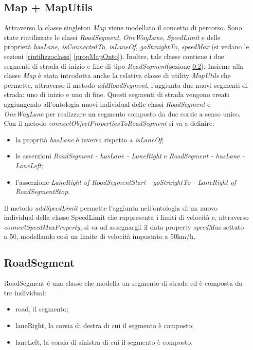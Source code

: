 \subsection{Map + MapUtils}
Attraverso la classe singleton \textit{Map} viene modellato il concetto di percorso.
Sono state riutilizzate le classi \textit{RoadSegment}, \textit{OneWayLane}, \textit{SpeedLimit} e delle propriet\`a \textit{hasLane}, \textit{isConnectedTo}, \textit{isLaneOf}, \textit{goStraightTo}, \textit{speedMax} (si vedano le sezioni \ref{riutilizzoclassi} \ref{propMapOnto}).
Inoltre, tale classe contiene i due segmenti di strada di inizio e fine di tipo \textit{RoadSegment}(sezione \ref{roadsegment}).
Insieme alla classe \textit{Map} \`e stata introdotta anche la relativa classe di utility \textit{MapUtils} che permette, attraverso il metodo \textit{addRoadSegment}, l'aggiunta due nuovi segmenti di strada: uno di inizio e uno di fine.
Questi segmenti di strada vengono creati aggiungendo all'ontologia nuovi individual delle classi \textit{RoadSegment} e \textit{OneWayLane} per realizzare un segmento composto da due corsie a senso unico.
Con il metodo \textit{connectObjectPropertiesToRoadSegment} si va a definire:
\begin{itemize}
\item la proprit\`a \textit{hasLane} \`e inversa rispetto a \textit{isLaneOf};
\item le asserzioni \textit{RoadSegment - hasLane - LaneRight} e \textit{RoadSegment - hasLane - LaneLeft};
\item l'asserzione \textit{LaneRight of RoadSegmentStart - goStraightTo - LaneRight of RoadSegmentStop}.
\end{itemize}
Il metodo \textit{addSpeedLimit} permette l'aggiunta nell'ontologia di un nuovo individual della classe SpeedLimit che rappresenta i limiti di velocit\`a e, attraverso \textit{connectSpeedMaxProperty}, si va ad assegnargli il data property \textit{speedMax} settato a 50, modellando cos\`i un limite di velocit\`a impostato a 50km/h.
\subsection{RoadSegment}\label{roadsegment}
RoadSegment \`e una classe che modella un segmento di strada ed \`e composta da tre individual:
\begin{itemize}
\item road, il segmento;
\item laneRight, la corsia di destra di cui il segmento \`e composto;
\item laneLeft, la corsia di sinistra di cui il segmento \`e composto.
\end{itemize}
